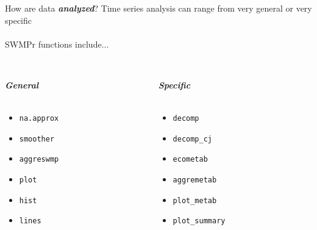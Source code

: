 \documentclass[serif]{beamer}\usepackage[]{graphicx}\usepackage[]{color}
\newcommand{\Bigtxt}[1]{\textbf{\textit{#1}}}
\begin{document}
\begin{frame}{How are data \Bigtxt{analyzed}?}
Time series analysis can range from very general or very specific \\~\\
SWMPr functions include...\\~\\
\begin{columns}
\begin{column}{0.45\textwidth}
\Bigtxt{General} \\~\\
\begin{itemize}
\item \texttt{na.approx}
\item \texttt{smoother}
\item \texttt{aggreswmp}
\item \texttt{plot}
\item \texttt{hist}
\item \texttt{lines}
\end{itemize}
\end{column}
\begin{column}{0.45\textwidth}
\Bigtxt{Specific} \\~\\
\begin{itemize}
\item \texttt{decomp}
\item \texttt{decomp\_cj}
\item \texttt{ecometab}
\item \texttt{aggremetab}
\item \texttt{plot\_metab}
\item \texttt{plot\_summary}
\end{itemize}
\end{column}
\end{columns}
\end{frame}
\end{document}
